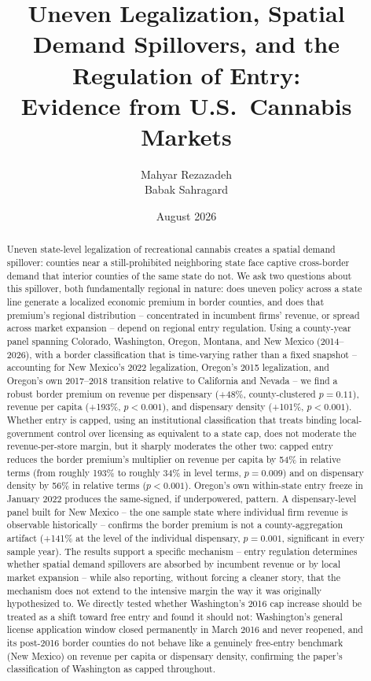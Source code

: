\documentclass[12pt]{article}
\title{Uneven Legalization, Spatial Demand Spillovers, and the Regulation of Entry:\\
Evidence from U.S.\ Cannabis Markets}
\author{Mahyar Rezazadeh \\ Babak Sahragard}
\date{August 2026}
\begin{document}
\maketitle

\begin{abstract}
\noindent Uneven state-level legalization of recreational cannabis creates a spatial demand spillover: counties
near a still-prohibited neighboring state face captive cross-border demand that interior counties of the same
state do not. We ask two questions about this spillover, both fundamentally regional in nature: does uneven
policy across a state line generate a localized economic premium in border counties, and does that premium's
regional distribution -- concentrated in incumbent firms' revenue, or spread across market expansion -- depend
on regional entry regulation. Using a county-year panel spanning Colorado, Washington, Oregon, Montana, and
New Mexico (2014--2026), with a border classification that is time-varying rather than a fixed snapshot --
accounting for New Mexico's 2022 legalization, Oregon's 2015 legalization, and Oregon's own 2017--2018
transition relative to California and Nevada -- we find a robust border premium on revenue per dispensary
(+48\%, county-clustered $p=0.11$), revenue per capita (+193\%, $p<0.001$), and dispensary density (+101\%,
$p<0.001$). Whether entry is capped, using an institutional classification that treats binding local-government
control over licensing as equivalent to a state cap, does not moderate the revenue-per-store margin, but it
sharply moderates the other two: capped entry reduces the border premium's multiplier on revenue per capita by
54\% in relative terms (from roughly 193\% to roughly 34\% in level terms, $p=0.009$) and on dispensary
density by 56\% in relative terms ($p<0.001$). Oregon's own within-state
entry freeze in January 2022 produces the same-signed, if underpowered, pattern. A dispensary-level panel built
for New Mexico -- the one sample state where individual firm revenue is observable historically -- confirms the
border premium is not a county-aggregation artifact (+141\% at the level of the individual dispensary,
$p=0.001$, significant in every sample year). The results support a
specific mechanism -- entry regulation determines whether spatial demand spillovers are absorbed by incumbent
revenue or by local market expansion -- while also reporting, without forcing a cleaner story, that the
mechanism does not extend to the intensive margin the way it was originally hypothesized to. We directly
tested whether Washington's 2016 cap increase should be treated as a shift toward free entry and found it
should not: Washington's general license application window closed permanently in March 2016 and never
reopened, and its post-2016 border counties do not behave like a genuinely free-entry benchmark (New Mexico)
on revenue per capita or dispensary density, confirming the paper's classification of Washington as capped
throughout.
\end{abstract}
\end{document}
